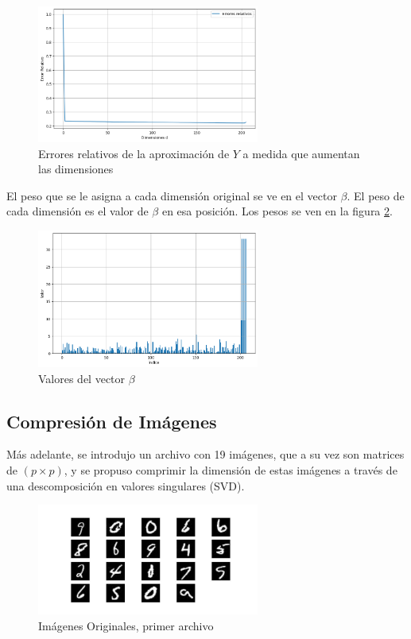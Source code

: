 \documentclass[12pt,a4]{article} %
\begin{document}
\begin{figure}[H]
    \centering
    \includegraphics[width=0.65\textwidth]{latex_project/plots1/ERRORS_dimensiones.png}
    \caption{Errores relativos de la aproximación de $Y$ a medida que aumentan las dimensiones}
    \label{fig:Norm_relative_error}
\end{figure}
El peso que se le asigna a cada dimensión original se ve en el vector $\beta$. El peso de cada dimensión es el valor de $\beta$ en esa posición. Los pesos se ven en la figura \ref{fig:BETA}.
\begin{figure}[H]
    \centering
    \includegraphics[width=0.65\textwidth]{latex_project/beta.png}
    \caption{Valores del vector $\beta$}
    \label{fig:BETA}
\end{figure}


\subsection{Compresión de Imágenes}
Más adelante, se introdujo un archivo con 19 imágenes, que a su vez son matrices de $(p \times p)$, y se propuso comprimir la dimensión de estas imágenes a través de una descomposición en valores singulares (SVD).
\begin{figure}[H]
    \centering
    \includegraphics[width=0.65\textwidth]{latex_project/Graficos_ej2/original_images1.jpeg}
    \caption{Imágenes Originales, primer archivo}
    \label{fig:original_images1}
\end{figure}
\\
\end{document}

